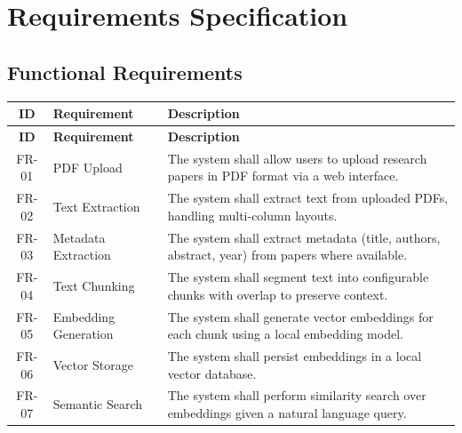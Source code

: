 \documentclass[12pt,a4paper]{article}
\begin{document}
\newpage

\section{Requirements Specification}

\subsection{Functional Requirements}

\begin{longtable}{|c|p{3.5cm}|p{7.5cm}|}
    \hline
    \textbf{ID} & \textbf{Requirement} & \textbf{Description} \\ \hline
    \endfirsthead
    \hline
    \textbf{ID} & \textbf{Requirement} & \textbf{Description} \\ \hline
    \endhead
    \hline
    \endfoot

    FR-01 & PDF Upload &
    The system shall allow users to upload research papers in PDF format
    via a web interface. \\ \hline

    FR-02 & Text Extraction &
    The system shall extract text from uploaded PDFs, handling
    multi-column layouts. \\ \hline

    FR-03 & Metadata Extraction &
    The system shall extract metadata (title, authors, abstract, year)
    from papers where available. \\ \hline

    FR-04 & Text Chunking &
    The system shall segment text into configurable chunks with overlap
    to preserve context. \\ \hline

    FR-05 & Embedding Generation &
    The system shall generate vector embeddings for each chunk using a
    local embedding model. \\ \hline

    FR-06 & Vector Storage &
    The system shall persist embeddings in a local vector database. \\ \hline

    FR-07 & Semantic Search &
    The system shall perform similarity search over embeddings given a
    natural language query. \\ \hline


\end{longtable}
\end{document}
